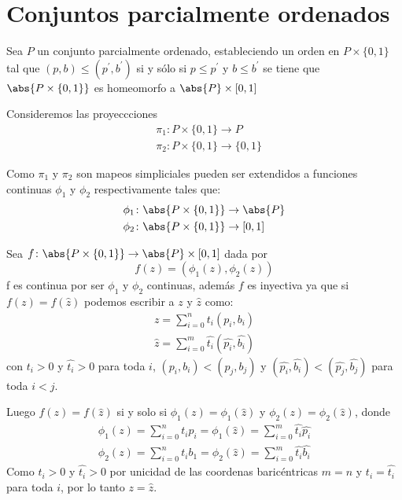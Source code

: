 \section{Conjuntos parcialmente ordenados}
\begin{Teo}
Sea $P$ un conjunto parcialmente ordenado, estableciendo un orden en $P\times\{0,1\}$ tal que $(p,b)\leq (p^{'},b^{'})$ si y sólo si $p\leq p^{'}$ y $b\leq b^{'}$ se tiene que $\abs{P\times\{0,1\}}$ es homeomorfo a $\abs{P}\times[0,1]$
\end{Teo} 

\begin{Dem}

Consideremos las proyeccciones
\begin{align*}
&\pi_1\colon P\times\{0,1\} \rightarrow P\\
&\pi_2\colon P\times\{0,1\} \rightarrow \{0,1\}
\end{align*}

Como $\pi_1$ y $\pi_2$ son mapeos simpliciales pueden ser extendidos a funciones continuas $\phi_1$ y $\phi_2$ respectivamente tales que:
\begin{align*}
&\phi_1\colon\abs{P\times\{0,1\}} \rightarrow \abs{P}\\
&\phi_2\colon\abs{P\times\{0,1\}} \rightarrow [0,1]
\end{align*}

Sea $f\colon\abs{P\times \{0,1\}} \rightarrow \abs{P}\times [0,1]$ dada por 
\begin{equation*}
f(z)= (\phi_1(z),\phi_2(z))
\end{equation*}
f es continua por ser $\phi_1$ y $\phi_2$ continuas, además $f$ es inyectiva ya que si $f(z)=f(\hat{z})$ podemos escribir a $z$ y $\hat{z}$ como:
\begin{eqnarray}
z = \sum_{i=0}^{n}t_i(p_i,b_i)\\
\hat{z} = \sum_{i=0}^{m}\hat{t_i}(\hat{p_i},\hat{b_i})
\end{eqnarray} 
con $t_i>0$ y $\hat{t_i}>0$ para toda $i$, $(p_i,b_i)<(p_j,b_j)$ y $(\hat{p_i},\hat{b_i})<(\hat{p_j},\hat{b_j})$ para toda $i<j$.

Luego $f(z) = f(\hat{z})$ si y solo si $\phi_1(z)=\phi_1(\hat{z})$ y $\phi_2(z)=\phi_2(\hat{z})$, donde 
\begin{eqnarray}
\phi_1(z) = \sum_{i=0}^{n}t_ip_i = \phi_1(\hat{z}) = \sum_{i=0}^{m}\hat{t_i}\hat{p_i}\\
\phi_2(z) = \sum_{i=0}^{n}t_ib_1 = \phi_2(\hat{z}) = \sum_{i=0}^{m}\hat{t_i}\hat{b_i}
\end{eqnarray}
Como $t_i>0$ y $\hat{t_i}>0$ por unicidad de las coordenas baricéntricas $m=n$ y $t_i = \hat{t_i}$ para toda $i$, por lo tanto $z = \hat{z}$.


\end{Dem}

